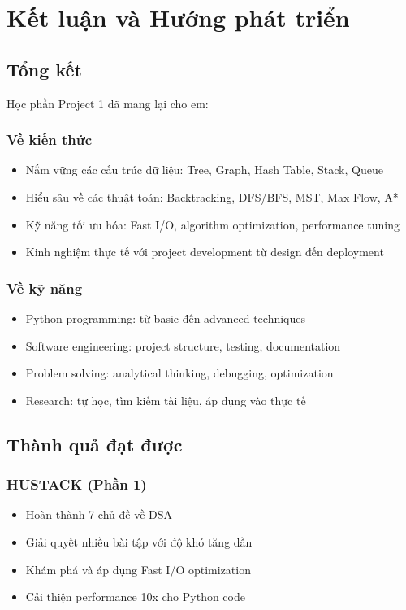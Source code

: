 \documentclass[12pt,a4paper]{article}
\begin{document}
\newpage
\section{Kết luận và Hướng phát triển}

\subsection{Tổng kết}
Học phần Project 1 đã mang lại cho em:

\subsubsection{Về kiến thức}
\begin{itemize}
    \item Nắm vững các cấu trúc dữ liệu: Tree, Graph, Hash Table, Stack, Queue
    \item Hiểu sâu về các thuật toán: Backtracking, DFS/BFS, MST, Max Flow, A*
    \item Kỹ năng tối ưu hóa: Fast I/O, algorithm optimization, performance tuning
    \item Kinh nghiệm thực tế với project development từ design đến deployment
\end{itemize}

\subsubsection{Về kỹ năng}
\begin{itemize}
    \item Python programming: từ basic đến advanced techniques
    \item Software engineering: project structure, testing, documentation
    \item Problem solving: analytical thinking, debugging, optimization
    \item Research: tự học, tìm kiếm tài liệu, áp dụng vào thực tế
\end{itemize}

\subsection{Thành quả đạt được}

\subsubsection{HUSTACK (Phần 1)}
\begin{itemize}
    \item Hoàn thành 7 chủ đề về DSA
    \item Giải quyết nhiều bài tập với độ khó tăng dần
    \item Khám phá và áp dụng Fast I/O optimization
    \item Cải thiện performance 10x cho Python code
\end{itemize}
\end{document}
